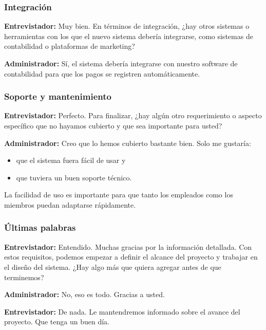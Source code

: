 \documentclass[spanish, 12pt]{article}
\providecommand{\tightlist}{\setlength{\itemsep}{0pt}
\setlength{\parskip}{0pt}}
\begin{document}
	\subsubsection{Integración}
	\label{integraciuxf3n}

	\textbf{Entrevistador:} Muy bien. En términos de integración, ¿hay otros sistemas
	o herramientas con los que el nuevo sistema debería integrarse, como sistemas
	de contabilidad o plataformas de marketing?

	\textbf{Administrador:} Sí, el sistema debería integrarse con nuestro software
	de contabilidad para que los pagos se registren automáticamente.

	\subsubsection{Soporte y mantenimiento}
	\label{soporte-y-mantenimiento}

	\textbf{Entrevistador:} Perfecto. Para finalizar, ¿hay algún otro
	requerimiento o aspecto específico que no hayamos cubierto y que sea
	importante para usted?

	\textbf{Administrador:} Creo que lo hemos cubierto bastante bien. Solo me
	gustaría:

	\begin{itemize}
		\tightlist

		\item que el sistema fuera fácil de usar y

		\item que tuviera un buen soporte técnico.
	\end{itemize}

	La facilidad de uso es importante para que tanto los empleados como los miembros
	puedan adaptarse rápidamente.

	\subsubsection{Últimas palabras}
	\label{uxfaltimas-palabras}

	\textbf{Entrevistador:} Entendido. Muchas gracias por la información detallada.
	Con estos requisitos, podemos empezar a definir el alcance del proyecto y
	trabajar en el diseño del sistema. ¿Hay algo más que quiera agregar antes de que
	terminemos?

	\textbf{Administrador:} No, eso es todo. Gracias a usted.

	\textbf{Entrevistador:} De nada. Le mantendremos informado sobre el avance del
	proyecto. Que tenga un buen día.
\end{document}
